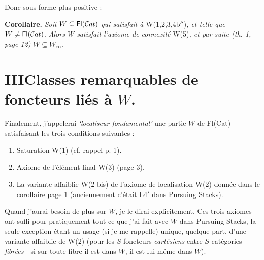 Donc sous forme plus positive :

\textbf{Corollaire.} \textit{Soit} $W \subseteq \mathsf{Fl}(\mathcal{C}at)$ \textit{qui satisfait à} W(1,2,3,4b$''$)\textit{, et telle que} $W \neq \mathsf{Fl}(\mathcal{C}at)$. \textit{Alors $W$ satisfait l'axiome de connexité} W(5)\textit{, et par suite (th. 1, page 12)} $W \subseteq W_\infty$.


\section*{III\quad Classes remarquables de foncteurs liés à $W$.}

Finalement, j'appelerai \textit{‘localiseur fondamental’} une partie $W$ de Fl(Cat) satisfaisant les trois conditions suivantes : %

\begin{enumerate}
\item[(i)] Saturation W(1) (cf. rappel p. 1).
\item[(ii)] Axiome de l'élément final W(3) (page 3).
\item[(iii)] La variante affaiblie W(2 bis) de l'axiome de localisation W(2) donnée dans le corollaire page 1 (anciennement c'était L4$'$ dans Pursuing Stacks).
\end{enumerate}

Quand j'aurai besoin de plus sur $W$, je le dirai explicitement. Ces trois axiomes ont suffi pour pratiquement tout ce que j'ai fait avec $W$ dans Pursuing Stacks, la seule exception étant un usage (si je me rappelle) unique, quelque part, d'une variante affaiblie de W(2) (pour les $S$-foncteurs \textit{cartésiens} entre $S$-catégories \textit{fibrées} - si sur toute fibre il est dans $W$, il est lui-même dans $W$).


